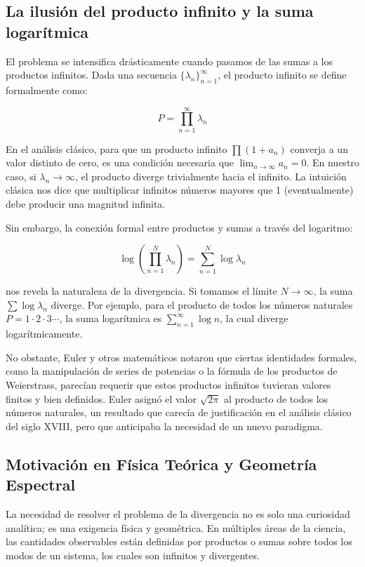 \subsection{La ilusión del producto infinito y la suma logarítmica}

El problema se intensifica drásticamente cuando pasamos de las sumas a los productos infinitos. Dada una secuencia $\{\lambda_n\}_{n=1}^{\infty}$, el producto infinito se define formalmente como:

$$ P = \prod_{n=1}^{\infty} \lambda_n $$

En el análisis clásico, para que un producto infinito $\prod (1 + a_n)$ converja a un valor distinto de cero, es una condición necesaria que $\lim_{n \to \infty} a_n = 0$. En nuestro caso, si $\lambda_n \to \infty$, el producto diverge trivialmente hacia el infinito. La intuición clásica nos dice que multiplicar infinitos números mayores que 1 (eventualmente) debe producir una magnitud infinita.

Sin embargo, la conexión formal entre productos y sumas a través del logaritmo:

$$ \log \left( \prod_{n=1}^{N} \lambda_n \right) = \sum_{n=1}^{N} \log \lambda_n $$

nos revela la naturaleza de la divergencia. Si tomamos el límite $N \to \infty$, la suma $\sum \log \lambda_n$ diverge. Por ejemplo, para el producto de todos los números naturales $P = 1 \cdot 2 \cdot 3 \cdots$, la suma logarítmica es $\sum_{n=1}^{\infty} \log n$, la cual diverge logarítmicamente. 

No obstante, Euler y otros matemáticos notaron que ciertas identidades formales, como la manipulación de series de potencias o la fórmula de los productos de Weierstrass, parecían requerir que estos productos infinitos tuvieran valores finitos y bien definidos. Euler asignó el valor $\sqrt{2\pi}$ al producto de todos los números naturales, un resultado que carecía de justificación en el análisis clásico del siglo XVIII, pero que anticipaba la necesidad de un nuevo paradigma.

\subsection{Motivación en Física Teórica y Geometría Espectral}

La necesidad de resolver el problema de la divergencia no es solo una curiosidad analítica; es una exigencia física y geométrica. En múltiples áreas de la ciencia, las cantidades observables están definidas por productos o sumas sobre todos los modos de un sistema, los cuales son infinitos y divergentes.

